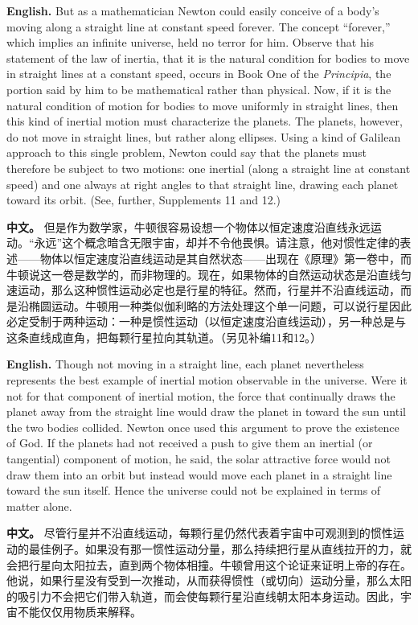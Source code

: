 \noindent\textbf{English.} But as a mathematician Newton could easily conceive of a body's moving along a straight line at constant speed forever. The concept ``forever,'' which implies an infinite universe, held no terror for him. Observe that his statement of the law of inertia, that it is the natural condition for bodies to move in straight lines at a constant speed, occurs in Book One of the \emph{Principia}, the portion said by him to be mathematical rather than physical. Now, if it is the natural condition of motion for bodies to move uniformly in straight lines, then this kind of inertial motion must characterize the planets. The planets, however, do not move in straight lines, but rather along ellipses. Using a kind of Galilean approach to this single problem, Newton could say that the planets must therefore be subject to two motions: one inertial (along a straight line at constant speed) and one always at right angles to that straight line, drawing each planet toward its orbit. (See, further, Supplements 11 and 12.)
\par\noindent\textbf{中文。} 但是作为数学家，牛顿很容易设想一个物体以恒定速度沿直线永远运动。“永远”这个概念暗含无限宇宙，却并不令他畏惧。请注意，他对惯性定律的表述——物体以恒定速度沿直线运动是其自然状态——出现在《原理》第一卷中，而牛顿说这一卷是数学的，而非物理的。现在，如果物体的自然运动状态是沿直线匀速运动，那么这种惯性运动必定也是行星的特征。然而，行星并不沿直线运动，而是沿椭圆运动。牛顿用一种类似伽利略的方法处理这个单一问题，可以说行星因此必定受制于两种运动：一种是惯性运动（以恒定速度沿直线运动），另一种总是与这条直线成直角，把每颗行星拉向其轨道。（另见补编11和12。）
\medskip

\noindent\textbf{English.} Though not moving in a straight line, each planet nevertheless represents the best example of inertial motion observable in the universe. Were it not for that component of inertial motion, the force that continually draws the planet away from the straight line would draw the planet in toward the sun until the two bodies collided. Newton once used this argument to prove the existence of God. If the planets had not received a push to give them an inertial (or tangential) component of motion, he said, the solar attractive force would not draw them into an orbit but instead would move each planet in a straight line toward the sun itself. Hence the universe could not be explained in terms of matter alone.
\par\noindent\textbf{中文。} 尽管行星并不沿直线运动，每颗行星仍然代表着宇宙中可观测到的惯性运动的最佳例子。如果没有那一惯性运动分量，那么持续把行星从直线拉开的力，就会把行星向太阳拉去，直到两个物体相撞。牛顿曾用这个论证来证明上帝的存在。他说，如果行星没有受到一次推动，从而获得惯性（或切向）运动分量，那么太阳的吸引力不会把它们带入轨道，而会使每颗行星沿直线朝太阳本身运动。因此，宇宙不能仅仅用物质来解释。
\medskip

